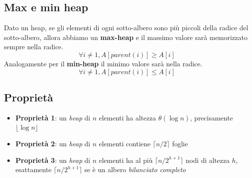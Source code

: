 \subsection{Max e min heap}
Dato un heap, se gli elementi di ogni sotto-albero sono più piccoli della radice del sotto-albero, allora abbiamo un \textbf{max-heap} e il massimo valore sarà memorizzato sempre nella radice.
\begin{equation}
	\forall i \neq 1, A[parent(i)] \geq A[i]
\end{equation}
Analogamente per il \textbf{min-heap} il minimo valore sarà nella radice.
\begin{equation}
	\forall i \neq 1, A[parent(i)] \leq A[i]
\end{equation}

\subsection{Proprietà}
\begin{itemize}
	\item \textbf{Proprietà 1}: un \textit{heap} di $n$ elementi ha altezza $\theta(\log{n})$, precisamente \color{red} $\lfloor \log{n} \rfloor$ \color{black}
	\item \textbf{Proprietà 2}: un \textit{heap} di $n$ elementi contiene \color{red} $\lceil n/2 \rceil$ \color{black} foglie
	\item \textbf{Proprietà 3}: un \textit{heap} di $n$ elementi ha al più \color{red} $\lceil n/2^{h+1} \rceil$ \color{black} nodi di altezza $h$, esattamente $\lceil n/2^{h+1} \rceil$ se è un albero \textit{bilanciato completo}
\end{itemize}